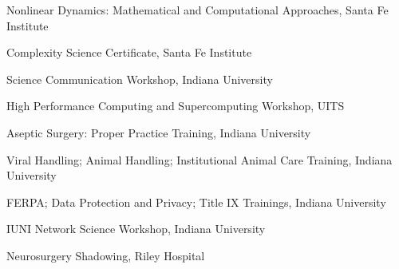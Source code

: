 
\begin{cventries}

  \cventry
    {} %
    {} %
    {} %
    {} %
    {
      \begin{cvitems} %
         \item{Nonlinear Dynamics: Mathematical and Computational Approaches,  Santa Fe Institute}
	\item{Complexity Science Certificate, Santa Fe Institute}
        \item {Science Communication Workshop, Indiana University }
	\item{High Performance Computing and Supercomputing Workshop, UITS }
	\item{Aseptic Surgery: Proper Practice Training, Indiana University}
	\item{Viral Handling; Animal Handling; Institutional Animal Care Training, Indiana University}
	\item{FERPA; Data Protection and Privacy; Title IX Trainings, Indiana University}
	\item{IUNI Network Science Workshop, Indiana University}
	\item{Neurosurgery Shadowing, Riley Hospital}
      \end{cvitems}
    }

\end{cventries}





